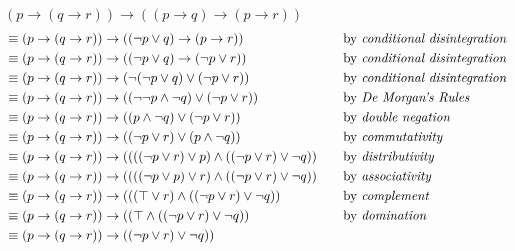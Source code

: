 \documentclass[11pt,a4paper]{article}
\begin{document}
\begin{enumerate}
\begin{enumerate}
        $(p \rightarrow (q \rightarrow r)) \rightarrow ((p \rightarrow q) \rightarrow (p \rightarrow r))$
        \begin{align*}
            &\equiv (p \rightarrow (q \rightarrow r)) \rightarrow ((\neg p \lor q) \rightarrow (p \rightarrow r)) 
                &\quad
                &\text{by \emph{conditional disintegration}} \\
            &\equiv (p \rightarrow (q \rightarrow r)) \rightarrow ((\neg p \lor q) \rightarrow (\neg p \lor r)) 
                &\quad
                &\text{by \emph{conditional disintegration}} \\
            &\equiv (p \rightarrow (q \rightarrow r)) \rightarrow (\neg (\neg p \lor q) \lor (\neg p \lor r))
                &\quad
                &\text{by \emph{conditional disintegration}} \\
            &\equiv (p \rightarrow (q \rightarrow r)) \rightarrow ((\neg \neg p \land \neg q) \lor (\neg p \lor r))
                &\quad
                &\text{by \emph{De Morgan's Rules}} \\
            &\equiv (p \rightarrow (q \rightarrow r)) \rightarrow ((p \land \neg q) \lor (\neg p \lor r))
                &\quad
                &\text{by \emph{double negation}} \\
            &\equiv (p \rightarrow (q \rightarrow r)) \rightarrow ((\neg p \lor r) \lor (p \land \neg q))
                &\quad
                &\text{by \emph{commutativity}} \\
            &\equiv (p \rightarrow (q \rightarrow r)) \rightarrow ((((\neg p \lor r) \lor p) \land ((\neg p \lor r) \lor \neg q))
                &\quad
                &\text{by \emph{distributivity}} \\
            &\equiv (p \rightarrow (q \rightarrow r)) \rightarrow ((((\neg p \lor p) \lor r) \land ((\neg p \lor r) \lor \neg q))
                &\quad
                &\text{by \emph{associativity}} \\
            &\equiv (p \rightarrow (q \rightarrow r)) \rightarrow (((\top \lor r) \land ((\neg p \lor r) \lor \neg q))
                &\quad
                &\text{by \emph{complement}} \\
            &\equiv (p \rightarrow (q \rightarrow r)) \rightarrow ((\top \land ((\neg p \lor r) \lor \neg q))
                &\quad 
                &\text{by \emph{domination}} \\
            &\equiv (p \rightarrow (q \rightarrow r)) \rightarrow ((\neg p \lor r) \lor \neg q))

\end{align*}
\end{enumerate}
\end{enumerate}
\end{document}
